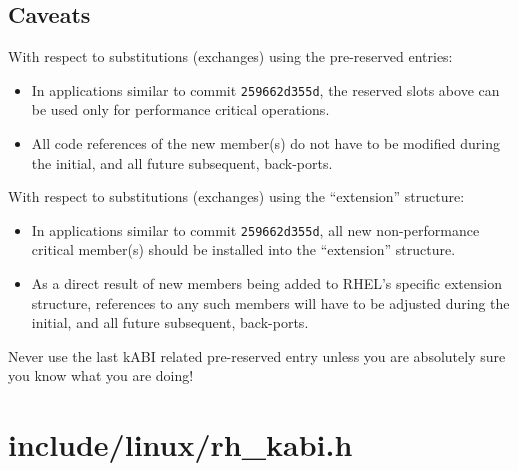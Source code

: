 \documentclass[10pt,oneside,english]{book}
\begin{document}
\subsection{Caveats}

With respect to substitutions (exchanges) using the pre-reserved entries:
\begin{itemize}
\item In applications similar to commit \texttt{259662d355d}, the reserved
slots above can be used only for performance critical operations.
\item All code references of the new member(s) do not have to be modified
during the initial, and all future subsequent, back-ports.
\end{itemize}
With respect to substitutions (exchanges) using the ``extension''
structure:
\begin{itemize}
\item In applications similar to commit \texttt{259662d355d}, all new non-performance
critical member(s) should be installed into the ``extension'' structure.
\item As a direct result of new members being added to RHEL's specific extension
structure, references to any such members will have to be adjusted
during the initial, and all future subsequent, back-ports.
\end{itemize}
Never use the last kABI related pre-reserved entry unless you are
absolutely sure you know what you are doing!

\section{include/linux/rh\_kabi.h \label{sec:include/linux/rh_kabi.h}}
\end{document}
